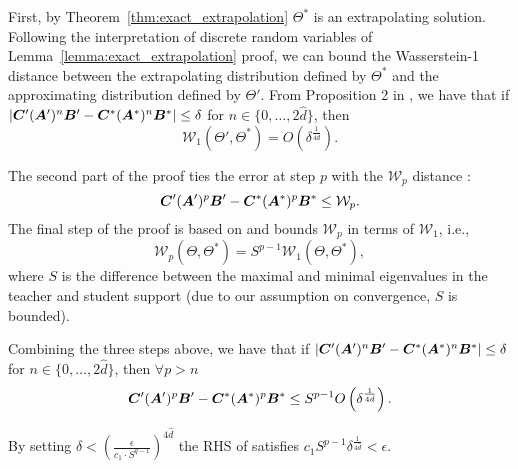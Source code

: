 \begin{sproof}
{First, by Theorem~\ref{thm:exact_extrapolation} $\Theta^*$ is an extrapolating solution. Following the interpretation of discrete random variables of Lemma~\ref{lemma:exact_extrapolation} proof, we can bound the Wasserstein-1 distance between the extrapolating distribution defined by $\Theta^*$ and the approximating distribution defined by $\Theta'$. From Proposition 2 in \cite{wu2020optimal}, we have that if $|{\bm{C}}'({\bm{A}}')^n{\bm{B}}'-{\bm{C}}^*({\bm{A}}^*)^n{\bm{B}}^*|\le \delta$ for $n\in\lbrace 0,\dots,2\hat{d}\rbrace$, then
\begin{equation}
    \mathcal{W}_1(\Theta',\Theta^*)=O\left(\delta^{\frac{1}{4\hat{d}}}\right).
\end{equation}

The second part of the proof ties the error at step $p$ with the $\mathcal{W}_p$ distance \citep{biswas2021bounding}:
\begin{equation}
    {\bm{C}}'({\bm{A}}')^p{\bm{B}}'-{\bm{C}}^*({\bm{A}}^*)^p{\bm{B}}^*\le \mathcal{W}_p.
\end{equation}
The final step of the proof is based on \cite{panaretos2019statistical} and bounds $\mathcal{W}_p$ in terms of $\mathcal{W}_1$, i.e.,
\begin{equation}
    \mathcal{W}_p(\Theta,\Theta^*)= S^{p-1}\mathcal{W}_1(\Theta,\Theta^*),
\end{equation}
where $S$ is the difference between the maximal and minimal eigenvalues in the teacher and student support (due to our assumption on convergence, $S$ is bounded).


Combining the three steps above, we have that if $|{\bm{C}}'({\bm{A}}')^n{\bm{B}}'-{\bm{C}}^*({\bm{A}}^*)^n{\bm{B}}^*|\le \delta$ for $n\in\lbrace 0,\dots,2\hat{d}\rbrace$, then $\forall p>n$ \begin{equation}\label{eq:final_inequality}
    {\bm{C}}'({\bm{A}}')^p{\bm{B}}'-{\bm{C}}^*({\bm{A}}^*)^p{\bm{B}}^*\le S^{p-1}O\left(\delta^{\frac{1}{4\hat{d}}}\right).
\end{equation}

By setting $\delta<\left(\frac{\epsilon}{c_1\cdot S^{q-1}}\right)^{4\hat{d}}$ the RHS of  satisfies $c_1S^{p-1}\delta^{\frac{1}{4\hat{d}}}<\epsilon$.
}
\end{sproof}


